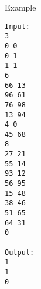 Example
\begin{verbatim}
Input:
3
0 0
0 1
1 1
6
66 13
96 61
76 98
13 94
4 0
45 68
8
27 21
55 14
93 12
56 95
15 48
38 46
51 65
64 31
0

Output:
1
1
0
\end{verbatim}